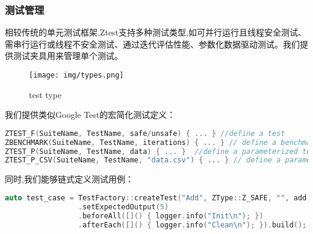 \documentclass{article}
\begin{document}
\subsubsection{测试管理}


相较传统的单元测试框架,Ztest支持多种测试类型,如可并行运行且线程安全测试、需串行运行或线程不安全测试、通过迭代评估性能、参数化数据驱动测试。我们提供测试夹具用来管理单个测试。

\begin{figure}[H]
    \centering
    \texttt{[image: img/types.png]} %
    \caption{ test type}
    \label{fig:test types }
\end{figure}
我们提供类似Google Test的宏简化测试定义：
\begin{framed}
    \begin{lstlisting}[language=C++]
ZTEST_F(SuiteName, TestName, safe/unsafe) { ... } //define a test 
ZBENCHMARK(SuiteName, TestName, iterations) { ... } // define a benchmark
ZTEST_P(SuiteName, TestName, data) { ... }  //define a parameterized test
ZTEST_P_CSV(SuiteName, TestName, "data.csv") { ... } // define a parameterized test with csv data
\end{lstlisting}
\end{framed}

同时,我们能够链式定义测试用例：
\begin{framed}
    \begin{lstlisting}[language=C++]
auto test_case = TestFactory::createTest("Add", ZType::Z_SAFE, "", add, 2, 3)
                 .setExpectedOutput(5)
                 .beforeAll([]() { logger.info("Init\n"); })          
                 .afterEach([]() { logger.info("Clean\n"); }).build();
                \end{lstlisting}
\end{framed}
\end{document}
